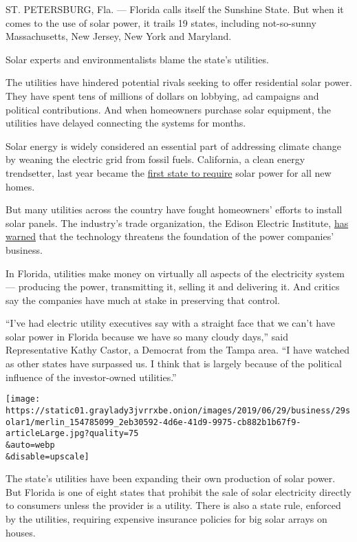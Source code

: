 ST. PETERSBURG, Fla. --- Florida calls itself the Sunshine State. But
when it comes to the use of solar power, it trails 19 states, including
not-so-sunny Massachusetts, New Jersey, New York and Maryland.

Solar experts and environmentalists blame the state's utilities.

The utilities have hindered potential rivals seeking to offer
residential solar power. They have spent tens of millions of dollars on
lobbying, ad campaigns and political contributions. And when homeowners
purchase solar equipment, the utilities have delayed connecting the
systems for months.

Solar energy is widely considered an essential part of addressing
climate change by weaning the electric grid from fossil fuels.
California, a clean energy trendsetter, last year became the
\href{https://www.nytimes3xbfgragh.onion/2018/05/09/business/energy-environment/california-solar-power.html}{first
state to require} solar power for all new homes.

But many utilities across the country have fought homeowners' efforts to
install solar panels. The industry's trade organization, the Edison
Electric Institute,
\href{http://roedel.faculty.asu.edu/PVGdocs/EEI-2013-report.pdf}{has
warned} that the technology threatens the foundation of the power
companies' business.

In Florida, utilities make money on virtually all aspects of the
electricity system --- producing the power, transmitting it, selling it
and delivering it. And critics say the companies have much at stake in
preserving that control.

``I've had electric utility executives say with a straight face that we
can't have solar power in Florida because we have so many cloudy days,''
said Representative Kathy Castor, a Democrat from the Tampa area. ``I
have watched as other states have surpassed us. I think that is largely
because of the political influence of the investor-owned utilities.''

\texttt{[image: https://static01.graylady3jvrrxbe.onion/images/2019/06/29/business/29solar1/merlin\_154785099\_2eb30592-4d6e-41d9-9975-cb882b1b67f9-articleLarge.jpg?quality=75\\\&auto=webp\\\&disable=upscale]}

The state's utilities have been expanding their own production of solar
power. But Florida is one of eight states that prohibit the sale of
solar electricity directly to consumers unless the provider is a
utility. There is also a state rule, enforced by the utilities,
requiring expensive insurance policies for big solar arrays on houses.

